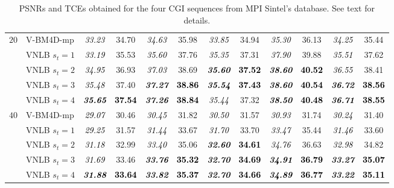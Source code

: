 \documentclass[10pt, journal, twocolumn, final, a4paper]{IEEEtran}
\newcommand{\bsic}[1]{\textcolor{black}{\textit{#1}}}
\newcommand{\Bsic}[1]{\textcolor{black}{\textbf{\textit{#1}}}}
\newcommand{\Best}[1]{\textbf{\textcolor{black}{#1}}}
\begin{document}
\begin{table}[htp!]
\begin{center}
{\begin{tabular}{ c | l |c c | c c | c c | c c | c c}
%
			\multirow{1}{*}{$20$}
			                      & V-BM4D-mp            & \bsic{33.23} &       34.70  & \bsic{34.63} &       35.98  & \bsic{33.85} &       34.94  & \bsic{35.30} &       36.13  & \bsic{34.25} &       35.44  \\
			                      & VNLB   $s_t = 1$     & \bsic{33.19} &       35.53  & \bsic{35.60} &       37.76  & \bsic{35.35} &       37.31  & \bsic{37.90} &       39.88  & \bsic{35.51} &       37.62  \\
			                      & VNLB   $s_t = 2$     & \bsic{34.95} &       36.93  & \bsic{37.03} &       38.69  & \Bsic{35.60} & \Best{37.52} & \Bsic{38.60} & \Best{40.52} & \bsic{36.55} &       38.41  \\
			                      & VNLB   $s_t = 3$     & \bsic{35.48} &       37.40  & \Bsic{37.27} & \Best{38.86} & \Bsic{35.54} & \Best{37.43} & \Bsic{38.60} & \Best{40.54} & \Bsic{36.72} & \Best{38.56} \\
			                      & VNLB   $s_t = 4$     & \Bsic{35.65} & \Best{37.54} & \Bsic{37.26} & \Best{38.84} & \bsic{35.44} &       37.32  & \Bsic{38.50} & \Best{40.48} & \Bsic{36.71} & \Best{38.55} \\\hline
%
			\multirow{1}{*}{$40$}
			                      & V-BM4D-mp            & \bsic{29.07} &       30.46  & \bsic{30.45} &       31.82  & \bsic{30.50} &       31.57  & \bsic{30.93} &       31.74  & \bsic{30.24} &       31.40  \\
			                      & VNLB   $s_t = 1$     & \bsic{29.25} &       31.57  & \bsic{31.44} &       33.67  & \bsic{31.70} &       33.70  & \bsic{33.47} &       35.44  & \bsic{31.46} &       33.60  \\
			                      & VNLB   $s_t = 2$     & \bsic{31.18} &       32.99  & \bsic{33.40} &       35.06  & \Bsic{32.60} & \Best{34.61} & \bsic{34.76} &       36.63  & \bsic{32.98} &       34.82  \\
			                      & VNLB   $s_t = 3$     & \bsic{31.69} &       33.46  & \Bsic{33.76} & \Best{35.32} & \Bsic{32.70} & \Best{34.69} & \Bsic{34.91} & \Best{36.79} & \Bsic{33.27} & \Best{35.07} \\
			                      & VNLB   $s_t = 4$     & \Bsic{31.88} & \Best{33.64} & \Bsic{33.82} & \Best{35.37} & \Bsic{32.70} & \Best{34.66} & \Bsic{34.89} & \Best{36.77} & \Bsic{33.22} & \Best{35.11} \\\hline
		\end{tabular}}
	\end{center}
	\caption{PSNRs and TCEs obtained for the four CGI sequences from MPI
	Sintel's database. See text for details.}
	\label{tab:sintel}
\end{table}
\end{document}
